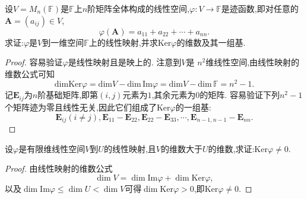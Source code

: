 \documentclass[../../main.tex]{subfiles}%
\begin{document}
\begin{example}
设\(V = M_n(\mathbb{F})\)是\(\mathbb{F}\)上\(n\)阶矩阵全体构成的线性空间,\(\varphi:V\to\mathbb{F}\)是迹函数,即对任意的\(\boldsymbol{A}=(a_{ij})\in V\),
\[
\varphi(\boldsymbol{A})=a_{11}+a_{22}+\cdots + a_{nn}.
\]
求证:\(\varphi\)是\(V\)到一维空间\(\mathbb{F}\)上的线性映射,并求\(\text{Ker}\varphi\)的维数及其一组基.
\end{example}
\begin{proof}

容易验证\(\varphi\)是线性映射且是映上的. 注意到\(V\)是
$n^2$维线性空间,由线性映射的维数公式可知
\[
\mathrm{dimKer}\varphi =\mathrm{dim}V-\mathrm{dim}\,\mathrm{Im}\varphi =\mathrm{dim}V-\mathrm{dim}\,\mathbb{F} =n^2-1.
\]
记\(\boldsymbol{E}_{ij}\)为\(n\)阶基础矩阵,即第\((i,j)\)元素为\(1\),其余元素为\(0\)的矩阵. 容易验证下列\(n^2 - 1\)个矩阵迹为零且线性无关,因此它们组成了\(\text{Ker}\varphi\)的一组基:
\[
\boldsymbol{E}_{ij}(i\neq j),\boldsymbol{E}_{11}-\boldsymbol{E}_{22},\boldsymbol{E}_{22}-\boldsymbol{E}_{33},\cdots,\boldsymbol{E}_{n - 1,n - 1}-\boldsymbol{E}_{nn}. 
\]

\end{proof}

\begin{example}
设\(\varphi\)是有限维线性空间\(V\)到\(U\)的线性映射,且\(V\)的维数大于\(U\)的维数,求证:\(\text{Ker}\varphi\neq 0\).
\end{example}
\begin{proof}

由线性映射的维数公式
\[
\dim V=\dim\text{Im}\varphi+\dim\text{Ker}\varphi,
\]
以及\(\dim\text{Im}\varphi\leqslant \dim U<\dim V\)可得\(\dim\text{Ker}\varphi>0\),即\(\text{Ker}\varphi\neq 0\).

\end{proof}
\end{document}
